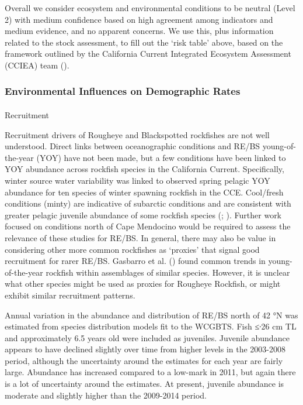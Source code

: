 \documentclass[
]{scrartcl}
\makeatletter
\let\oldparagraph\paragraph
\renewcommand{\paragraph}{
    \@ifstar
      \xxxParagraphStar
      \xxxParagraphNoStar
  }
\newcommand{\xxxParagraphStar}[1]{\oldparagraph*{#1}\mbox{}}
\newcommand{\xxxParagraphNoStar}[1]{\oldparagraph{#1}\mbox{}}
\makeatother
\begin{document}
Overall we consider ecosystem and environmental conditions to be neutral
(Level 2) with medium confidence based on high agreement among
indicators and medium evidence, and no apparent concerns. We use this,
plus information related to the stock assessment, to fill out the `risk
table' above, based on the framework outlined by the California Current
Integrated Ecosystem Assessment (CCIEA) team
().

\subsubsection{Environmental Influences on Demographic
Rates}\label{environmental-influences-on-demographic-rates}

\paragraph{Recruitment}\label{recruitment-1}

Recruitment drivers of Rougheye and Blackspotted rockfishes are not well
understood. Direct links between oceanographic conditions and RE/BS
young-of-the-year (YOY) have not been made, but a few conditions have
been linked to YOY abundance across rockfish species in the California
Current. Specifically, winter source water variability was linked to
observed spring pelagic YOY abundance for ten species of winter spawning
rockfish in the CCE. Cool/fresh conditions (minty) are indicative of
subarctic conditions and are consistent with greater pelagic juvenile
abundance of some rockfish species
(;
). Further work
focused on conditions north of Cape Mendocino would be required to
assess the relevance of these studies for RE/BS. In general, there may
also be value in considering other more common rockfishes as `proxies'
that signal good recruitment for rarer RE/BS. Gasbarro et al.
() found common trends in
young-of-the-year rockfish within assemblages of similar species.
However, it is unclear what other species might be used as proxies for
Rougheye Rockfish, or might exhibit similar recruitment patterns.

Annual variation in the abundance and distribution of RE/BS north of 42
°N was estimated from species distribution models fit to the WCGBTS.
Fish ≤∙26 cm TL and approximately 6.5 years old were included as
juveniles. Juvenile abundance appears to have declined slightly over
time from higher levels in the 2003-2008 period, although the
uncertainty around the estimates for each year are fairly large.
Abundance has increased compared to a low-mark in 2011, but again there
is a lot of uncertainty around the estimates. At present, juvenile
abundance is moderate and slightly higher than the 2009-2014 period.
\end{document}
